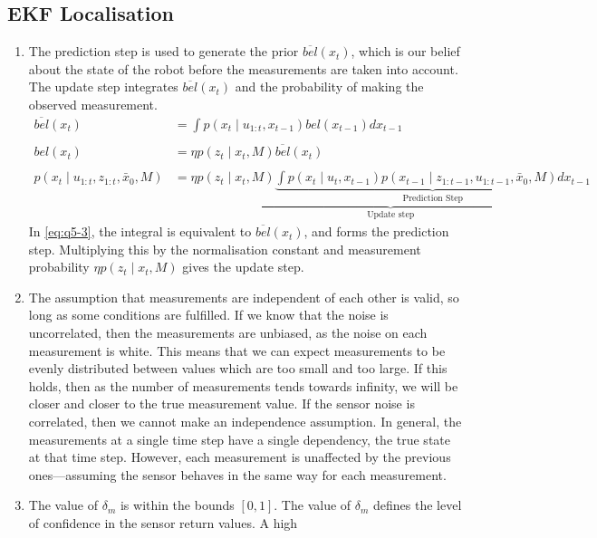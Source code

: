 \documentclass[a4paper,12pt]{article}
\newcommand{\eqname}[1]{\tag*{#1}} %
\begin{document}
\subsection{EKF Localisation}
\begin{enumerate}[resume]
\item The prediction step is used to generate the prior $\overline{bel}(x_t)$,
  which is our belief about the state of the robot before the measurements are
  taken into account. The update step integrates $\overline{bel}(x_t)$ and the
  probability of making the observed measurement.
  \begin{align}
    \overline{bel}(x_t)&=\int{p(x_t \mid
      u_{1:t},x_{t-1})bel(x_{t-1})dx_{t-1}}\\\eqname{Prediction step} \\
    bel(x_t)&=\eta p(z_t \mid x_t,M)\overline{bel}(x_t)\\\eqname{Update step}\\
    p(x_t\mid u_{1:t},z_{1:t},\bar{x}_0,M)&=\underbrace{\eta p(z_t \mid x_t,M)\underbrace{\int{p(x_t \mid
      u_t,x_{t-1})p(x_{t-1} \mid
      z_{1:t-1},u_{1:t-1},\bar{x}_0,M)dx_{t-1}}}_\text{Prediction
    Step}}_\text{Update step}\label{eq:q5-3}
  \end{align}
  In \eqref{eq:q5-3}, the integral is equivalent to $\overline{bel}(x_t)$, and forms
  the prediction step. Multiplying this by the normalisation constant and
  measurement probability $\eta p(z_t \mid x_t,M)$ gives the update step.
\item The assumption that measurements are independent of each other is valid,
  so long as some conditions are fulfilled. If we know that the noise is
  uncorrelated, then the measurements are unbiased, as the noise on each
  measurement is white. This means that we can expect measurements to be evenly
  distributed between values which are too small and too large. If this holds,
  then as the number of measurements tends towards infinity, we will be closer
  and closer to the true measurement value. If the sensor noise is correlated,
  then we cannot make an independence assumption. In general, the measurements
  at a single time step have a single dependency, the true state at that time
  step. However, each measurement is unaffected by the previous ones---assuming
  the sensor behaves in the same way for each measurement.
\item The value of $\delta_m$ is within the bounds $[0,1]$. The value of
  $\delta_m$ defines the level of confidence in the sensor return values. A high

\end{enumerate}
\end{document}
